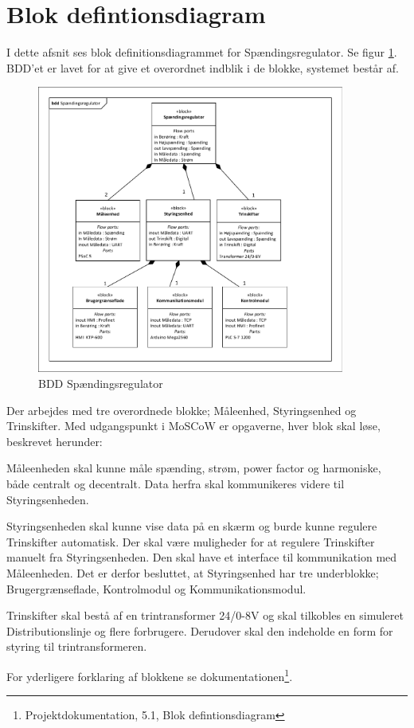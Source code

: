 \newpage
\section{Blok defintionsdiagram}

I dette afsnit ses blok definitionsdiagrammet for Spændingsregulator. Se figur \ref{fig:BDDSpaendingsregulator}. BDD'et er lavet for at give et overordnet indblik i de blokke, systemet består af.

\begin{figure}[H] %
	\centering
	\includegraphics[width=0.9\textwidth]{Figure/BDDSpaendingsregulator}
	\caption{BDD Spændingsregulator}
	\label{fig:BDDSpaendingsregulator}
\end{figure}

Der arbejdes med tre overordnede blokke; Måleenhed, Styringsenhed og Trinskifter. Med udgangspunkt i MoSCoW er opgaverne, hver blok skal løse, beskrevet herunder:


Måleenheden skal kunne måle spænding, strøm, power factor og harmoniske, både centralt og decentralt. Data herfra skal kommunikeres videre til Styringsenheden. 


Styringsenheden skal kunne vise data på en skærm og burde kunne regulere Trinskifter automatisk. Der skal være muligheder for at regulere Trinskifter manuelt fra Styringsenheden. Den skal have et interface til kommunikation med Måleenheden. Det er derfor besluttet, at Styringsenhed har tre underblokke; Brugergrænseflade, Kontrolmodul og Kommunikationsmodul.


Trinskifter skal bestå af en trintransformer 24/0-8V og skal tilkobles en simuleret Distributionslinje og flere forbrugere. Derudover skal den indeholde en form for styring til trintransformeren.


For yderligere forklaring af blokkene se dokumentationen\footnote{Projektdokumentation, 5.1, Blok defintionsdiagram}.